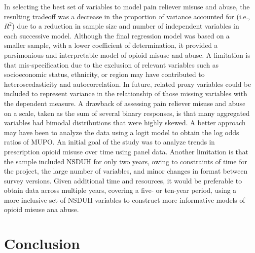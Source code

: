 \documentclass[sigconf]{acmart}
\begin{document}
In selecting the best set of variables to model pain reliever misuse and abuse, 
the resulting tradeoff was a decrease in the proportion of variance accounted 
for (i.e., $R^2$) due to a reduction in sample size and number of independent 
variables in each successive model. Although the final regression model was 
based on a smaller sample, with a lower coefficient of determination, it 
provided a parsimonious and interpretable model of opioid misuse and abuse. 
A limitation is that mis-specification due to the exclusion of relevant variables 
such as socioeconomic status, ethnicity, or region may have contributed to
heteroscedasticity and autocorrelation. In future, related proxy variables could 
be included to represent variance in the relationship of those missing variables 
with the dependent measure. A drawback of assessing pain reliever misuse and 
abuse on a scale, taken as the sum of several binary responses, is that many 
aggregated variables had bimodal distributions that were highly skewed. A 
better approach may have been to analyze the data using a logit model to obtain 
the log odds ratios of MUPO. An initial goal of the study was to analyze trends 
in prescription opioid misuse over time using panel data. Another limitation is 
that the sample included NSDUH for only two years, owing to constraints of time 
for the project, the large number of variables, and minor changes in format 
between survey versions. Given additional time and resources, it would be 
preferable to obtain data across multiple years, covering a five- or ten-year 
period, using a more inclusive set of NSDUH variables to construct more 
informative models of opioid misuse ana abuse.

\section{Conclusion}
\end{document}

